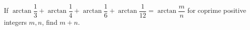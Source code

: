 If $\arctan\dfrac{1}{3}+\arctan\dfrac{1}{4}+\arctan\dfrac{1}{6}+\arctan\dfrac{1}{12}=\arctan\dfrac{m}{n}$ for coprime positive integers $m,n$, find $m+n$.
